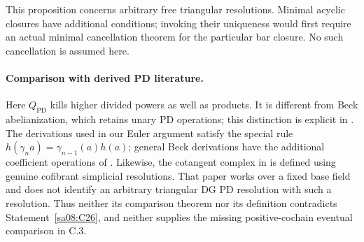 This proposition concerns arbitrary free triangular resolutions.
Minimal acyclic closures have additional conditions; invoking their
uniqueness would first require an actual minimal cancellation theorem
for the particular bar closure. No such cancellation is assumed here.


\paragraph{Comparison with derived PD literature.}
Here $Q_{\mathrm{PD}}$ kills higher divided powers as well as products.
It is different from Beck abelianization, which retains unary
PD operations; this distinction is explicit in
\cite[Sections~3 and~6]{A_kmail_kozak_miller2025}.
The derivations used in our Euler argument satisfy the special
rule $h(\gamma_n a)=\gamma_{n-1}(a)h(a)$; general Beck
derivations have the additional coefficient operations of
\cite[Lemma~5.2]{A_kmail_kozak_miller2025}.
Likewise, the cotangent complex in
\cite[Definition~2.6, Example~2.9 and Theorem~8.2]{A_dokas_frankland_ikonicoff2025}
is defined using genuine cofibrant simplicial resolutions.
That paper works over a fixed base field and does not identify
an arbitrary triangular DG PD resolution with such a resolution.
Thus neither its comparison theorem nor its definition contradicts
Statement~\ref{sa08:C26}, and neither supplies the missing
positive-cochain eventual comparison in C.3.
